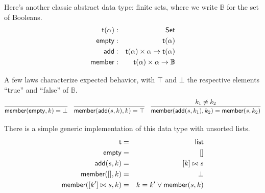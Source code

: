 \documentclass{amsbook}
\theoremstyle{definition}
\theoremstyle{remark}
\numberwithin{section}{chapter}
\numberwithin{equation}{chapter}
\begin{document}
Here's another classic abstract data type: finite sets, where we write $\mathbb B$ for the set of Booleans.
\begin{eqnarray*}
  \mathsf{t}(\alpha) &:& \mathsf{Set} \\
  \mathsf{empty} &:& \mathsf{t}(\alpha) \\
  \mathsf{add} &:& \mathsf{t}(\alpha) \times \alpha \to \mathsf{t}(\alpha) \\
  \mathsf{member} &:& \mathsf{t}(\alpha) \times \alpha \to \mathbb B
\end{eqnarray*}

A few laws characterize expected behavior, with $\top$ and $\bot$ the respective elements ``true'' and ``false'' of $\mathbb B$.
$$\infer{\mt{member}(\mt{empty}, k) = \bot}{}
\quad \infer{\mt{member}(\mt{add}(s, k), k) = \top}{}
\quad \infer{\mt{member}(\mt{add}(s, k_1), k_2) = \mt{member}(s, k_2)}{k_1 \neq k_2}$$

There is a simple generic implementation of this data type with unsorted lists.
\begin{eqnarray*}
  \mathsf{t} &=& \mathsf{list} \\
  \mathsf{empty} &=& [] \\
  \mathsf{add}(s, k) &=& [k] \bowtie s \\
  \mathsf{member}([], k) &=& \bot \\
  \mathsf{member}([k'] \bowtie s, k) &=& k = k' \lor \mathsf{member}(s, k)
\end{eqnarray*}
\end{document}
